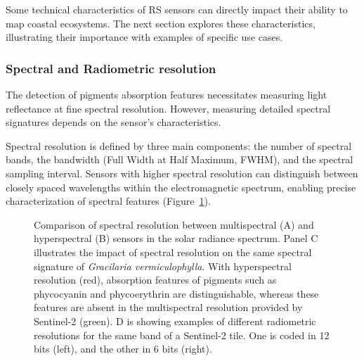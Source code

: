 \documentclass[
  letterpaper,
  11pt,
  english,
  singlespacing,
  headsepline]{MastersDoctoralThesis}
\begin{document}
\begin{spacing}{1.5}
\begin{tcolorbox}
Some technical characteristics of RS sensors can directly impact their ability to map coastal ecosystems. The next section explores these characteristics, illustrating their importance with examples of specific use cases.
\end{tcolorbox}

\subsubsection{Spectral and Radiometric
resolution}\label{spectral-and-radiometric-resolution}

The detection of pigments absorption features necessitates measuring
light reflectance at fine spectral resolution. However, measuring
detailed spectral signatures depends on the sensor's characteristics.

Spectral resolution is defined by three main components: the number of
spectral bands, the bandwidth (Full Width at Half Maximum, FWHM), and
the spectral sampling interval. Sensors with higher spectral resolution
can distinguish between closely spaced wavelengths within the
electromagnetic spectrum, enabling precise characterization of spectral
features (Figure~\ref{fig-Spectral_resolutions}).

\begin{figure}


\caption{\label{fig-Spectral_resolutions}Comparison of spectral
resolution between multispectral (A) and hyperspectral (B) sensors in
the solar radiance spectrum. Panel C illustrates the impact of spectral
resolution on the same spectral signature of \emph{Gracilaria
vermiculophylla}. With hyperspectral resolution (red), absorption
features of pigments such as phycocyanin and phycoerythrin are
distinguishable, whereas these features are absent in the multispectral
resolution provided by Sentinel-2 (green). D is showing examples of
different radiometric resolutions for the same band of a Sentinel-2
tile. One is coded in 12 bits (left), and the other in 6 bits (right).}


\end{figure}
\end{spacing}
\end{document}

